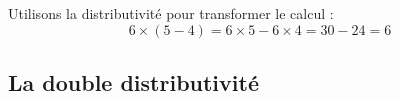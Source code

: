 \documentclass[a4paper,dvipsnames]{article}
\begin{document}
\begin{Ex}
Utilisons la distributivité pour transformer le calcul :
\[6\times (5-4)=6\times5-6\times4=30-24=6\]
\end{Ex}


\subsection{La double distributivité}

\end{document}
